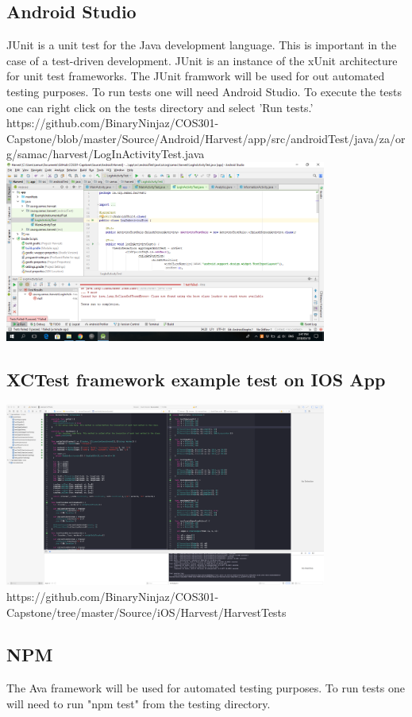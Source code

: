 \documentclass[12pt]{article}
\begin{document}
  \subsection{Android Studio}
JUnit is a unit test for the Java development language. This is important in the case of a test-driven development. JUnit is an instance of the xUnit architecture for unit test frameworks. The JUnit framwork will be used for out automated testing purposes. To run tests one will need Android Studio. To execute the tests one can right click on the tests directory and select 'Run tests.'\newline
https://github.com/BinaryNinjaz/COS301-Capstone/blob/master/Source/Android/Harvest/app/src/androidTest/java/za/org/samac/harvest/LogInActivityTest.java \newline
\includegraphics[width=400px]{images/FailedLoginTest}
\subsection{ XCTest framework example test on IOS App}
\includegraphics[width=400px]{images/iostest}
https://github.com/BinaryNinjaz/COS301-Capstone/tree/master/Source/iOS/Harvest/HarvestTests \newline

  \subsection{NPM}
  The Ava framework will be used for automated testing purposes. To run tests one will need to run "npm test" from the testing directory.
\end{document}
